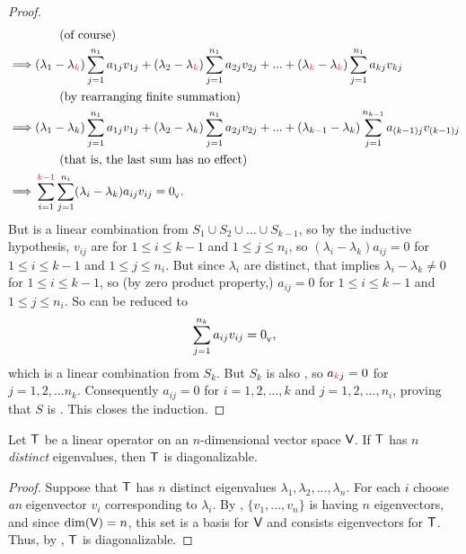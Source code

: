 \begin{proof}
\begin{align*}
             & \quad \quad \text{(of course)} \\
    \implies & (\lambda_1 - \lambda_{\RED{k}}) \sum_{j = 1}^{n_1} a_{1j} v_{1j} + (\lambda_2 - \lambda_{\RED{k}}) \sum_{j = 1}^{n_1} a_{2j} v_{2j} + ... + (\lambda_{\RED{k}} - \lambda_{\RED{k}}) \sum_{j = 1}^{n_1} a_{kj} v_{kj} \\
            & \quad \quad \text{(by rearranging finite summation)} \\
    \implies & (\lambda_1 - \lambda_k) \sum_{j = 1}^{n_1} a_{1j} v_{1j} + (\lambda_2 - \lambda_k) \sum_{j = 1}^{n_1} a_{2j} v_{2j} + ... + (\lambda_{k - 1} - \lambda_k) \sum_{j = 1}^{n_{k - 1}} a_{(k - 1)j} v_{(k - 1)j} \\
             & \quad \quad \text{(that is, the last sum has no effect)} \\
    \implies & \sum_{i = 1}^{\RED{k - 1}} \sum_{j = 1}^{n_i} (\lambda_i - \lambda_k) a_{ij} v_{ij} = \OV.
\end{align*}
But  is a linear combination from \(S_1 \cup S_2 \cup ... \cup S_{k - 1}\), so by the inductive hypothesis, \(v_{ij}\) are \LID{} for \(1 \le i \le k - 1\) and \(1 \le j \le n_i\), so \((\lambda_i - \lambda_k) a_{ij} = 0\) for \(1 \le i \le k - 1\) and \(1 \le j \le n_i\).
But since \(\lambda_i\) are distinct, that implies \(\lambda_i - \lambda_k \ne 0\) for \(1 \le i \le k - 1\), so (by zero product property,) \(a_{ij} = 0\) for \(1 \le i \le k - 1\) and \(1 \le j \le n_i\).
So  can be reduced to
\[
    \sum_{j = 1}^{n_k} a_{ij} v_{ij} = 0_{_{\textsf{V}}},
\]
which is a linear combination from \(S_k\).
But \(S_k\) is also \LID{}, so \(a_{\RED{k}j} = 0\) for \(j = 1, 2, ... n_k\).
Consequently \(a_{ij} = 0\) for \(i = 1, 2, ..., k\) and \(j = 1, 2, ..., n_i\), proving that \(S\) is \LID{}.
This closes the induction.
\end{proof}

\begin{corollary} \label{corollary 5.5.1}
Let \(\textsf{T}\) be a linear operator on an \(n\)-dimensional vector space \(\textsf{V}\).
If \(\textsf{T}\) has \(n\) \emph{distinct} eigenvalues, then \(\textsf{T}\) is diagonalizable.
\end{corollary}

\begin{proof}
Suppose that \(\textsf{T}\) has \(n\) distinct eigenvalues \(\lambda_1, \lambda_2, ..., \lambda_n\).
For each \(i\) choose \emph{an} eigenvector \(v_i\) corresponding to \(\lambda_i\).
By , \(\{v_1, ..., v_n \}\) is \LID{} having \(n\) eigenvectors, and since \(\dim(\textsf{V}) = n\), this set is a basis for \(\textsf{V}\) and consists eigenvectors for \(\textsf{T}\).
Thus, by , \(\textsf{T}\) is diagonalizable.
\end{proof}

